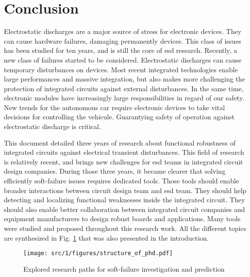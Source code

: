 \chapter*{Conclusion}
 
\label{sec:final-conclusion}

Electrostatic discharges are a major source of stress for electronic devices.
They can cause hardware failures, damaging permanently devices.
This class of issues has been studied for ten years, and is still the core of \gls{esd} research.
Recently, a new class of failures started to be considered.
Electrostatic discharges can cause temporary disturbances on devices.
Most recent integrated technologies enable large performances and massive integration, but also makes more challenging the protection of integrated circuits against external disturbances.
In the same time, electronic modules have increasingly large responsibilities in regard of our safety.
New trends for the autonomous car require electronic devices to take vital decisions for controlling the vehicule.
Guarantying safety of operation against electrostatic discharge is critical.

This document detailed three years of research about functional robustness of integrated circuits against electrical transient disturbances.
This field of research is relatively recent, and brings new challenges for \gls{esd} teams in integrated circuit design companies.
During those three years, it became clearer that solving efficiently soft-failure issues requires dedicated tools.
Those tools should enable broader interactions between circuit design team and \gls{esd} team.
They should help detecting and localizing functional weaknesses inside the integrated circuit.
They should also enable better collaboration between integrated circuit companies and equipment manufacturers to design robust boards and applications.
Many tools were studied and proposed throughout this research work.
All the different topics are synthesized in Fig. \ref{fig:phd-map-conclu} that was also presented in the introduction.

\begin{figure}[!h]
  \centering
  \texttt{[image: src/1/figures/structure\_of\_phd.pdf]}
  \caption{Explored research paths for soft-failure investigation and prediction}
  \label{fig:phd-map-conclu}
\end{figure}

